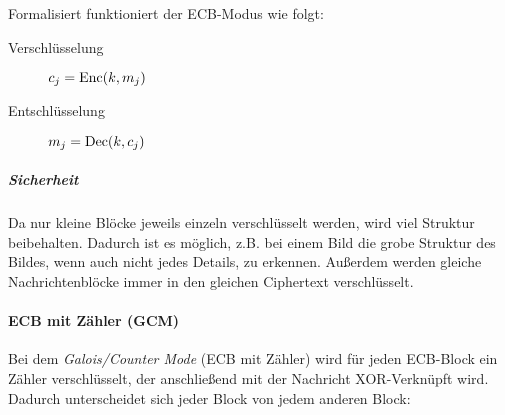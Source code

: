 				Formalisiert funktioniert der ECB-Modus wie folgt:
				\begin{description}
					\item[Verschlüsselung] \( c_j = \operatorname{Enc}(k, m_j) \)
					\item[Entschlüsselung] \( m_j = \operatorname{Dec}(k, c_j) \)
				\end{description}

				\subparagraph{Sicherheit}
					Da nur kleine Blöcke jeweils einzeln verschlüsselt werden, wird viel Struktur beibehalten. Dadurch ist es möglich, z.B. bei einem Bild die grobe Struktur des Bildes, wenn auch nicht jedes Details, zu erkennen. Außerdem werden gleiche Nachrichtenblöcke immer in den gleichen Ciphertext verschlüsselt.

			\paragraph{ECB mit Zähler (GCM)}
				Bei dem \textit{Galois/Counter Mode} (ECB mit Zähler) wird für jeden ECB-Block ein Zähler verschlüsselt, der anschließend mit der Nachricht XOR-Verknüpft wird. Dadurch unterscheidet sich jeder Block von jedem anderen Block:
